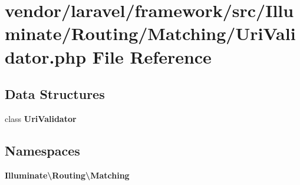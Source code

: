 \section{vendor/laravel/framework/src/\+Illuminate/\+Routing/\+Matching/\+Uri\+Validator.php File Reference}
\label{_uri_validator_8php}
\subsection*{Data Structures}
\begin{DoxyCompactItemize}
\item 
class {\bf Uri\+Validator}
\end{DoxyCompactItemize}
\subsection*{Namespaces}
\begin{DoxyCompactItemize}
\item 
 {\bf Illuminate\textbackslash{}\+Routing\textbackslash{}\+Matching}
\end{DoxyCompactItemize}

